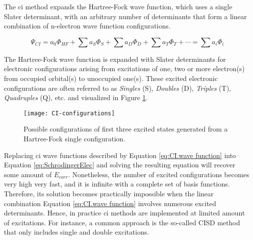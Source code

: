 \begin{refsection}

The \acrshort{ci} method \cite{c1:sherrill1999} expands the Hartree-Fock wave function, which uses a single Slater determinant, with an arbitrary number of determinants that form a linear combination of n-electron wave function configurations.

\begin{equation}
\Psi_{CI} = a_0\Phi_{HF} + \sum a_S\Phi_S + \sum a_D\Phi_D + \sum a_T\Phi_T  + \cdots = \sum a_i\Phi_i \label{eq:CI.wave function}
\end{equation}



\noindent The Hartree-Fock wave function is expanded with Slater determinants for electronic configurations arising from excitations of one, two or more electron(s) from  occupied orbital(s) to unoccupied one(s). These excited electronic configurations are often referred to as \textit{Singles} (S), \textit{Doubles} (D), \textit{Triples} (T), \textit{Quadruples} (Q), etc. and visualized in Figure \ref{fig:CI.configurations}.


\begin{figure}[htb!]
	\centering
	\texttt{[image: CI-configurations]}
	\caption{Possible configurations of first three excited states generated from a Hartree-Fock single configuration.}
	\label{fig:CI.configurations}
\end{figure}



Replacing \acrshort{ci} wave functions described by Equation \ref{eq:CI.wave function} into Equation \ref{eq:SchrodingerElec} and solving the resulting equation will recover some amount of $E_{corr}$. Nonetheless, the number of excited configurations becomes very high very fast, and it is infinite with a complete set of basis functions. Therefore, its solution becomes practically impossible when the linear combination Equation \ref{eq:CI.wave function} involves numerous excited determinants. Hence, in practice \acrshort{ci} methods are implemented at limited amount of excitations. For instance, a common approach is the so-called CISD method that only includes single and double excitations.


\end{refsection}
